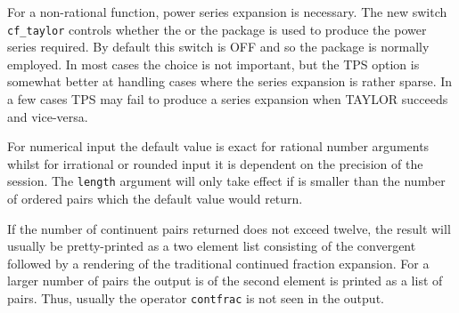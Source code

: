 \hypertarget{switch:CF_TAYLOR}{}

For a non-rational function, power series expansion is necessary. The new
switch \texttt{cf\_taylor} controls whether the  or the  package is
used to produce the power series required. By default this switch is OFF and
so the  package is normally employed.
In most cases the choice is not important, but the TPS option is somewhat
better at handling cases where the series expansion is rather sparse.
In a few cases TPS may fail to produce a series expansion when TAYLOR succeeds
and vice-versa.

For numerical input the default value is exact for
rational number arguments whilst for irrational or rounded input it is
dependent on the precision of the session. The
\texttt{length} argument will only take effect if is smaller
than the number of ordered pairs which the default value would return.

If the number of continuent pairs returned does not exceed
twelve, the result will usually be pretty-printed as a two element list
consisting of the convergent followed by a rendering of the traditional
continued fraction expansion. For a larger number of pairs the output is
of the second element is printed as a list of pairs. Thus, usually the
operator \texttt{contfrac} is not seen in the output.

